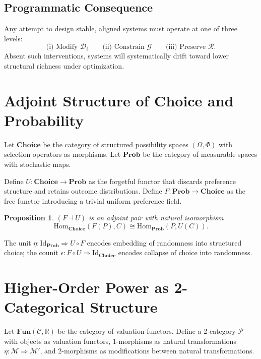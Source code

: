 \documentclass[11pt,a4paper]{article}
\newtheorem{proposition}[theorem]{Proposition}
\theoremstyle{definition}
\theoremstyle{remark}
\begin{document}
\subsection{Programmatic Consequence}

Any attempt to design stable, aligned systems must operate at one of three levels:
\[
\text{(i)\ Modify } \mathcal{D}_i \qquad \text{(ii)\ Constrain } \mathcal{G} \qquad \text{(iii)\ Preserve } \mathcal{R}.
\]
Absent such interventions, systems will systematically drift toward lower structural richness under optimization.

\section{Adjoint Structure of Choice and Probability}
\label{app:adjoint}

Let $\mathbf{Choice}$ be the category of structured possibility spaces $(\Omega, \Phi)$ with selection operators as morphisms. Let $\mathbf{Prob}$ be the category of measurable spaces with stochastic maps.

Define $U : \mathbf{Choice} \to \mathbf{Prob}$ as the forgetful functor that discards preference structure and retains outcome distributions. Define $F : \mathbf{Prob} \to \mathbf{Choice}$ as the free functor introducing a trivial uniform preference field.

\begin{proposition}
$(F \dashv U)$ is an adjoint pair with natural isomorphism
\[
\mathrm{Hom}_{\mathbf{Choice}}(F(P), C) \cong \mathrm{Hom}_{\mathbf{Prob}}(P, U(C)).
\]
\end{proposition}

The unit $\eta : \mathrm{Id}_{\mathbf{Prob}} \Rightarrow U \circ F$ encodes embedding of randomness into structured choice; the counit $\epsilon : F \circ U \Rightarrow \mathrm{Id}_{\mathbf{Choice}}$ encodes collapse of choice into randomness.

\section{Higher-Order Power as 2-Categorical Structure}

Let $\mathbf{Fun}(\mathcal{C}, \mathbb{R})$ be the category of valuation functors. Define a 2-category $\mathcal{P}$ with objects as valuation functors, 1-morphisms as natural transformations $\eta : \mathcal{M} \Rightarrow \mathcal{M}'$, and 2-morphisms as modifications between natural transformations.
\end{document}
